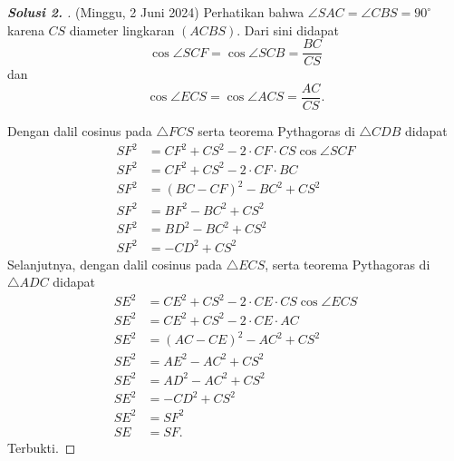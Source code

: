 \documentclass[letterpaper, 13pt]{scrartcl}
\begin{document}
\begin{proof}[\textbf{Solusi 2. }] (Minggu, 2 Juni 2024)
Perhatikan bahwa $\angle SAC = \angle CBS = 90^\circ$ karena $CS$ diameter lingkaran $(ACBS)$. Dari sini didapat
$$\cos \angle SCF = \cos \angle SCB = \frac{BC}{CS}$$
dan
$$\cos \angle ECS = \cos \angle ACS = \frac{AC}{CS}.$$

Dengan dalil cosinus pada $\triangle FCS$ serta teorema Pythagoras di $\triangle CDB$ didapat
\begin{align*}
    SF^2 &= CF^2 + CS^2 - 2\cdot CF \cdot CS \cos \angle SCF\\
    SF^2 &= CF^2 + CS^2 - 2\cdot CF \cdot BC\\
    SF^2 &= (BC-CF)^2 - BC^2 + CS^2\\
    SF^2 &= BF^2 - BC^2 + CS^2\\
    SF^2 &= BD^2 - BC^2 + CS^2\\
    SF^2 &= -CD^2 + CS^2
\end{align*}
Selanjutnya, dengan dalil cosinus pada $\triangle ECS$, serta teorema Pythagoras di $\triangle ADC$ didapat
\begin{align*}
    SE^2 &= CE^2 + CS^2 - 2\cdot CE \cdot CS \cos \angle ECS \\
    SE^2 &= CE^2 + CS^2 - 2\cdot CE \cdot AC\\
    SE^2 &= (AC-CE)^2 - AC^2 + CS^2\\
    SE^2 &= AE^2 - AC^2 + CS^2\\
    SE^2 &= AD^2 - AC^2 + CS^2\\
    SE^2 &= -CD^2 + CS^2\\
    SE^2 &= SF^2\\
    SE &= SF.
\end{align*}
Terbukti.
\end{proof}
\end{document}
